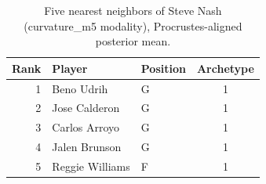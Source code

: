 \begin{table}[htbp]
  \centering\small
  \begin{tabular}{rllc}
    \toprule
    Rank & Player & Position & Archetype \\
    \midrule
    1 & Beno Udrih & G & 1 \\
    2 & Jose Calderon & G & 1 \\
    3 & Carlos Arroyo & G & 1 \\
    4 & Jalen Brunson & G & 1 \\
    5 & Reggie Williams & F & 1 \\
    \bottomrule
  \end{tabular}
  \caption{Five nearest neighbors of Steve Nash (curvature_m5 modality), Procrustes-aligned posterior mean.}
  \label{tab:Steve_Nash_neighbors_curvature_m5}
\end{table}

